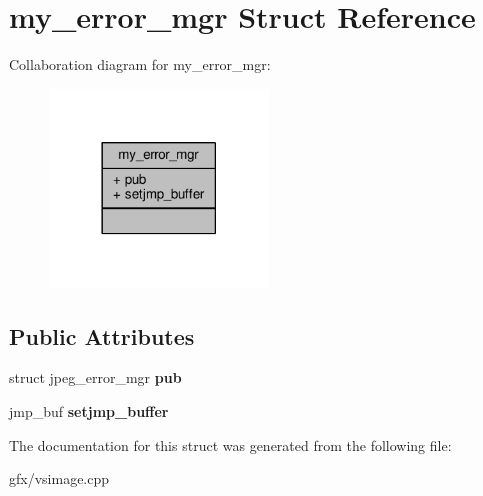 \hypertarget{structmy__error__mgr}{}\section{my\+\_\+error\+\_\+mgr Struct Reference}
\label{structmy__error__mgr}


Collaboration diagram for my\+\_\+error\+\_\+mgr\+:
\nopagebreak
\begin{figure}[H]
\begin{center}
\leavevmode
\includegraphics[width=165pt]{dc/d62/structmy__error__mgr__coll__graph}
\end{center}
\end{figure}
\subsection*{Public Attributes}
\begin{DoxyCompactItemize}
\item 
struct jpeg\+\_\+error\+\_\+mgr {\bfseries pub}\hypertarget{structmy__error__mgr_aac1fb61cc51b4d8edbb44ba85fcccdb4}{}\label{structmy__error__mgr_aac1fb61cc51b4d8edbb44ba85fcccdb4}

\item 
jmp\+\_\+buf {\bfseries setjmp\+\_\+buffer}\hypertarget{structmy__error__mgr_a751138dd0c774fe1d41bb5465b3a7539}{}\label{structmy__error__mgr_a751138dd0c774fe1d41bb5465b3a7539}

\end{DoxyCompactItemize}


The documentation for this struct was generated from the following file\+:\begin{DoxyCompactItemize}
\item 
gfx/vsimage.\+cpp\end{DoxyCompactItemize}
